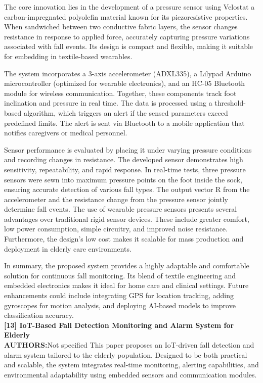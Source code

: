 \documentclass[a4paper, 12pt]{report}
\begin{document}
The core innovation lies in the development of a pressure sensor using Velostat a carbon-impregnated polyolefin material known for its piezoresistive properties. When sandwiched between two conductive fabric layers, the sensor changes resistance in response to applied force, accurately capturing pressure variations associated with fall events. Its design is compact and flexible, making it suitable for embedding in textile-based wearables.

The system incorporates a 3-axis accelerometer (ADXL335), a Lilypad Arduino microcontroller (optimized for wearable electronics), and an HC-05 Bluetooth module for wireless communication. Together, these components track foot inclination and pressure in real time. The data is processed using a threshold-based algorithm, which triggers an alert if the sensed parameters exceed predefined limits. The alert is sent via Bluetooth to a mobile application that notifies caregivers or medical personnel.

Sensor performance is evaluated by placing it under varying pressure conditions and recording changes in resistance. The developed sensor demonstrates high sensitivity, repeatability, and rapid response. In real-time tests, three pressure sensors were sewn into maximum pressure points on the foot inside the sock, ensuring accurate detection of various fall types. The output vector R from the accelerometer and the resistance change from the pressure sensor jointly determine fall events.
The use of wearable pressure sensors presents several advantages over traditional rigid sensor devices. These include greater comfort, low power consumption, simple circuitry, and improved noise resistance. Furthermore, the design’s low cost makes it scalable for mass production and deployment in elderly care environments.

In summary, the proposed system provides a highly adaptable and comfortable solution for continuous fall monitoring. Its blend of textile engineering and embedded electronics makes it ideal for home care and clinical settings. Future enhancements could include integrating GPS for location tracking, adding gyroscopes for motion analysis, and deploying AI-based models to improve classification accuracy.\\
\noindent\textbf{[13] IoT-Based Fall Detection Monitoring and Alarm System for Elderly}\\
\textbf{AUTHORS:}Not specified
This paper proposes an IoT-driven fall detection and alarm system tailored to the elderly population. Designed to be both practical and scalable, the system integrates real-time monitoring, alerting capabilities, and environmental adaptability using embedded sensors and communication modules.
\end{document}
